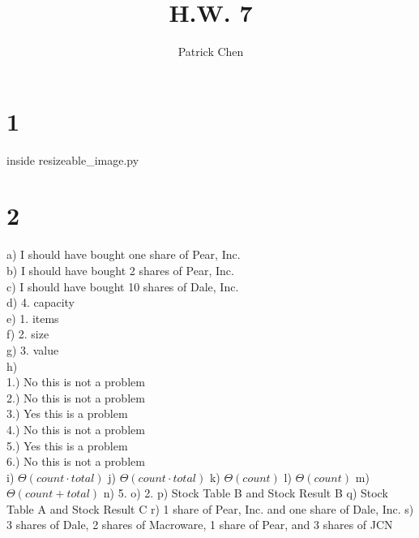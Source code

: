 \documentclass[10pt,a4paper]{article}
\title{H.W. 7}
\author{Patrick Chen}
\begin{document}
\maketitle
\tableofcontents
\section*{1}
inside resizeable_image.py
\section*{2}
a) I should have bought one share of Pear, Inc.  \\
b) I should have bought 2 shares of Pear, Inc. \\
c) I should have bought 10 shares of Dale, Inc. \\
d) 4. capacity \\
e) 1. items \\
f) 2. size \\
g) 3. value \\
h) \\
1.) No this is not a problem \\
2.) No this is not a problem \\
3.) Yes this is a problem \\
4.) No this is not a problem \\
5.) Yes this is a problem \\
6.) No this is not a problem \\
i) $\Theta(count \cdot total)$
j) $\Theta(count \cdot total)$
k) $\Theta(count)$
l) $\Theta(count)$
m) $\Theta(count + total)$
n) 5.
o) 2.
p) Stock Table B and Stock Result B
q) Stock Table A and Stock Result C
r) 1 share of Pear, Inc. and one share of Dale, Inc.
s) 3 shares of Dale, 2 shares of Macroware, 1 share of Pear, and 3 shares of JCN
\end{document}

